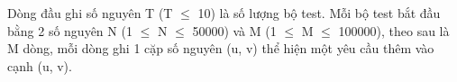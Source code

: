 Dòng đầu ghi số nguyên T (T  $\le$  10) là số lượng bộ test. Mỗi bộ test bắt đầu bằng 2 số nguyên N (1  $\le$  N  $\le$  50000) và M (1  $\le$  M  $\le$  100000), theo sau là M dòng, mỗi dòng ghi 1 cặp số nguyên (u, v) thể hiện một yêu cầu thêm vào cạnh (u, v).